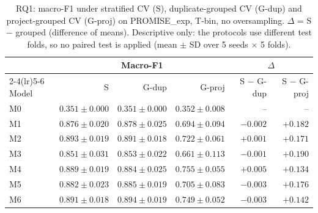 \begin{table}[t]
\centering
\caption{RQ1: macro-F1 under stratified CV (S), duplicate-grouped CV (G-dup) and project-grouped CV (G-proj) on PROMISE\_exp, T-bin, no oversampling. $\Delta$ = S $-$ grouped (difference of means). Descriptive only: the protocols use different test folds, so no paired test is applied (mean $\pm$ SD over 5 seeds $\times$ 5 folds).}
\label{tab:rq1}
\small
\setlength{\tabcolsep}{4pt}
\begin{tabular}{lrrrrr}
\toprule
& \multicolumn{3}{c}{Macro-F1} & \multicolumn{2}{c}{$\Delta$} \\
\cmidrule(lr){2-4}\cmidrule(lr){5-6}
Model & S & G-dup & G-proj & S $-$ G-dup & S $-$ G-proj \\
\midrule
M0 & $0.351 \pm 0.000$ & $0.351 \pm 0.000$ & $0.352 \pm 0.008$ & -- & -- \\
M1 & $0.876 \pm 0.020$ & $0.878 \pm 0.025$ & $0.694 \pm 0.094$ & $-0.002$ & $+0.182$ \\
M2 & $0.893 \pm 0.019$ & $0.891 \pm 0.018$ & $0.722 \pm 0.061$ & $+0.001$ & $+0.171$ \\
M3 & $0.851 \pm 0.031$ & $0.853 \pm 0.022$ & $0.661 \pm 0.113$ & $-0.001$ & $+0.190$ \\
M4 & $0.889 \pm 0.019$ & $0.884 \pm 0.025$ & $0.755 \pm 0.055$ & $+0.005$ & $+0.134$ \\
M5 & $0.882 \pm 0.023$ & $0.885 \pm 0.019$ & $0.705 \pm 0.083$ & $-0.003$ & $+0.176$ \\
M6 & $0.891 \pm 0.018$ & $0.894 \pm 0.019$ & $0.749 \pm 0.052$ & $-0.003$ & $+0.142$ \\
\bottomrule
\end{tabular}
\end{table}
